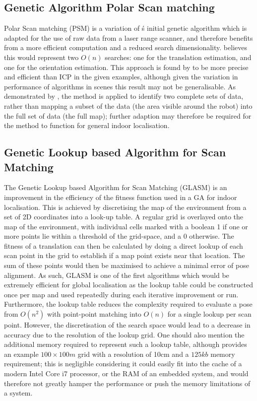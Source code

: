 \documentclass[authoryearcitations]{UoYCSproject}
\begin{document}
\subsection{Genetic Algorithm Polar Scan matching}
Polar Scan matching (PSM) is a variation of \citeauthor{Robertson2002-ou}\'s initial genetic algorithm which is adapted for the use of raw data from a laser range scanner, and therefore benefits from a more efficient computation and a reduced search dimensionality. \citet{Ze-Su2007-li} believes this would represent two $O(n)$ searches: one for the translation estimation, and one for the orientation estimation. This approach is found by \citeauthor{Ze-Su2007-li} to be more precise and efficient than ICP in the given examples, although given the variation in performance of algorithms in scenes \cite{Donoso2017-wp} this result may not be generalisable. As demonstrated by \citeauthor{Ze-Su2007-li}, the method is applied to identify two complete sets of data, rather than mapping a subset of the data (the area visible around the robot) into the full set of data (the full map); further adaption may therefore be required for the method to function for general indoor localisation.

\subsection{Genetic Lookup based Algorithm for Scan Matching}
The Genetic Lookup based Algorithm for Scan Matching (GLASM) \cite{Lenac2007-xm} is an improvement in the efficiency of the fitness function used in a GA for indoor localisation. This is achieved by discretising the map of the environment from a set of 2D coordinates into a look-up table. A regular grid is overlayed onto the map of the environment, with individual cells marked with a boolean 1 if one or more points lie within a threshold of the grid-space, and a 0 otherwise. The fitness of a translation can then be calculated by doing a direct lookup of each scan point in the grid to establish if a map point exists near that location. The sum of these points would then be maximised to achieve a minimal error of pose alignment. As such, GLASM is one of the first algorithms which would be extremely efficient for global localisation as the lookup table could be constructed once per map and used repeatedly during each iterative improvement or run. Furthermore, the lookup table reduces the complexity required to evaluate a pose from $O(n^2)$ with point-point matching into $O(n)$ for a single lookup per scan point. However, the discretisation of the search space would lead to a decrease in accuracy due to the resolution of the lookup grid. One should also mention the additional memory required to represent such a lookup table, although \citeauthor{Lenac2007-xm} provides an example $100\times100m$ grid with a resolution of 10cm and a $125kb$ memory requirement; this is negligible considering it could easily fit into the cache of a modern Intel Core i7 processor, or the RAM of an embedded system, and would therefore not greatly hamper the performance or push the memory limitations of a system. 
\end{document}
